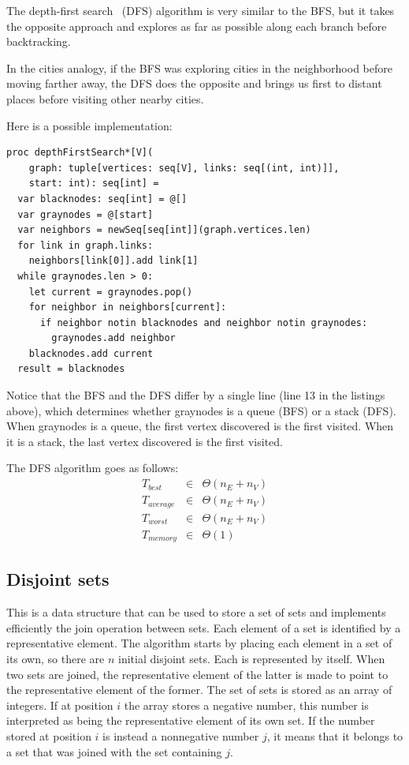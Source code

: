 \documentclass[justified, sixbynine]{tufte-book}
\def\ft{\small\tt}
\theoremstyle{plain}%
\newtheorem * {corollary}{Corollary}
\theoremstyle{definition}
\theoremstyle{remark}
\newtheorem * {remark}{Remark}
\newtheorem * {note}{Note}
\begin{document}
\begin{fullwidth}

The depth-first search~\cite{dfs} (DFS) algorithm is very similar to the BFS, but it takes the opposite approach and explores as far as possible along each branch before backtracking.

In the cities analogy, if the BFS was exploring cities in the neighborhood before moving farther away, the DFS does the opposite and brings us first to distant places before visiting other nearby cities.

Here is a possible implementation:

\begin{lstlisting}[caption={in file: {\ft nlib/graph.nim}}]
proc depthFirstSearch*[V](
    graph: tuple[vertices: seq[V], links: seq[(int, int)]],
    start: int): seq[int] =
  var blacknodes: seq[int] = @[]
  var graynodes = @[start]
  var neighbors = newSeq[seq[int]](graph.vertices.len)
  for link in graph.links:
    neighbors[link[0]].add link[1]
  while graynodes.len > 0:
    let current = graynodes.pop()
    for neighbor in neighbors[current]:
      if neighbor notin blacknodes and neighbor notin graynodes:
        graynodes.add neighbor
    blacknodes.add current
  result = blacknodes
\end{lstlisting}

Notice that the BFS and the DFS differ by a single line (line 13 in the listings above), which determines whether graynodes is a queue (BFS) or a stack (DFS). When graynodes is a queue, the first vertex discovered is the first visited. When it is a stack, the last vertex discovered is the first visited.

The DFS algorithm goes as follows:
\begin{eqnarray}
T_{best} &\in &\Theta (n_E+n_V) \\
T_{average} &\in &\Theta (n_E+n_V) \\
T_{worst} &\in &\Theta (n_E+n_V) \\
T_{memory} &\in &\Theta (1)
\end{eqnarray}

\subsection{Disjoint sets}


This is a data structure that can be used to store a set of sets and implements efficiently the join operation between sets.
Each element of a set is identified by a representative element. The algorithm starts by placing each element in a set of its own, so there are $n$ initial disjoint sets. Each is represented by itself. When two sets are joined, the representative element of the latter is made to point to the representative element of the former. The set of sets is stored as an array of integers. If at position $i$ the array stores a negative number, this number is interpreted as being the representative element of its own set. If the number stored at position $i$ is instead a nonnegative number $j$, it means that it belongs to a set that was joined with the set containing $j$.


\end{fullwidth}
\end{document}
